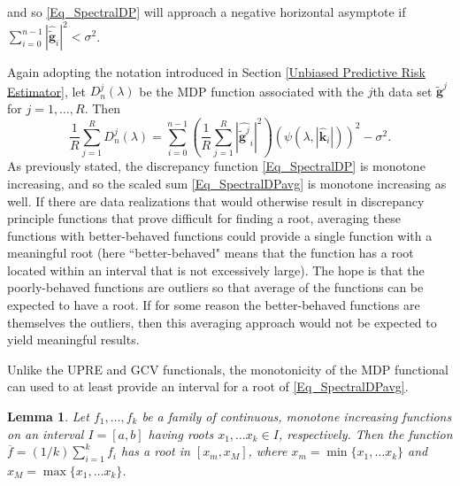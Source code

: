 \documentclass[12pt]{article}
\newcommand{\gnoise}{\widetilde{\mathbf{g}}}
\newcommand{\kdis}{\mathbf{k}}
\newcommand{\regparam}{\lambda}
\newcommand{\mfilt}{\psi}
\newcommand{\noiseSD}{\sigma}	%
\newcommand{\D}{D}	%
\newtheorem{lemma}{Lemma}[section]
\begin{document}
and so \eqref{Eq_SpectralDP} will approach a negative horizontal asymptote if $\sum_{i = 0}^{n-1} |\widehat{\gnoise}_i|^2 < \noiseSD^2$. \par 
Again adopting the notation introduced in Section \ref{Unbiased Predictive Risk Estimator}, let $\D_n^j(\regparam)$ be the MDP function associated with the $j$th data set $\gnoise^j$ for $j = 1,\ldots,R$. Then 
\begin{equation}
\frac{1}{R}\sum_{j=1}^R \D_n^j(\regparam)  = \sum_{i = 0}^{n-1} \left(\frac{1}{R} \sum_{j=1}^R |\widehat{\gnoise^j}_i|^2\right)(\mfilt(\regparam,|\widehat{\kdis}_i|))^2 - \noiseSD^2. 
\label{Eq_SpectralDPavg}
\end{equation}
As previously stated, the discrepancy function \eqref{Eq_SpectralDP} is monotone increasing, and so the scaled sum \eqref{Eq_SpectralDPavg} is monotone increasing as well. If there are data realizations that would otherwise result in discrepancy principle functions that prove difficult for finding a root, averaging these functions with better-behaved functions could provide a single function with a meaningful root (here ``better-behaved" means that the function has a root located within an interval that is not excessively large). The hope is that the poorly-behaved functions are outliers so that average of the functions can be expected to have a root. If for some reason the better-behaved functions are themselves the outliers, then this averaging approach would not be expected to yield meaningful results. \par 
Unlike the UPRE and GCV functionals, the monotonicity of the MDP functional can used to at least provide an interval for a root of \eqref{Eq_SpectralDPavg}. 
\begin{lemma}
Let $f_1,\ldots,f_k$ be a family of continuous, monotone increasing functions on an interval $I = [a,b]$ having roots $x_1,\ldots x_k \in I$, respectively. Then the function $\overline{f} = (1/k)\sum_{i=1}^k f_i$ has a root in $[x_m,x_M]$, where $x_m = \min\{x_1,\ldots x_k\}$ and $x_M = \max\{x_1,\ldots x_k\}$.
\end{lemma}
\end{document}
